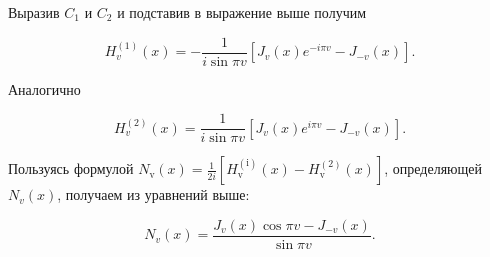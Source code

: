 Выразив $C_1$ и $C_2$ и подставив в выражение выше получим 

\[
H_{v}^{(1)}(x)=-\frac{1}{i \sin \pi v}\left[J_{v}(x) e^{-i \pi v}-J_{-v}(x)\right] .
\]

Аналогично

\[
H_{v}^{(2)}(x)=\frac{1}{i \sin \pi v}\left[J_{v}(x) e^{i \pi v}-J_{-v}(x)\right] .
\]

Пользуясь формулой $N_{\mathrm{v}}(x)=\frac{1}{2 i}\left[H_{\mathrm{v}}^{(\mathrm{i})}(x)-H_{\mathrm{v}}^{(2)}(x)\right]$, определяющей $N_{v}(x)$, получаем из уравнений выше:

\[
N_{v}(x)=\frac{J_{v}(x) \cos \pi v-J_{-v}(x)}{\sin \pi v} .
\]